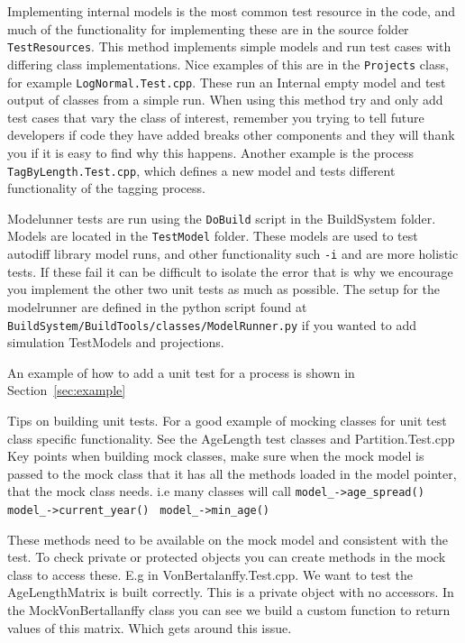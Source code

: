 Implementing internal models is the most common test resource in the code, and much of the functionality for implementing these are in the source folder \texttt{TestResources}. This method implements simple models and run test cases with differing class implementations. Nice examples of this are in the \texttt{Projects} class, for example \texttt{LogNormal.Test.cpp}. These run an Internal empty model and test output of classes from a simple run. When using this method try and only add test cases that vary the class of interest, remember you trying to tell future developers if code they have added breaks other components and they will thank you if it is easy to find why this happens. Another example is the process \texttt{TagByLength.Test.cpp}, which defines a new model and tests different functionality of the tagging process.


Modelunner tests are run using the \texttt{DoBuild} script in the BuildSystem folder. Models are located in the \texttt{TestModel} folder. These models are used to test autodiff library model runs, and other functionality such \texttt{-i} and are more holistic tests. If these fail it can be difficult to isolate the error that is why we encourage you implement the other two unit tests as much as possible. The setup for the modelrunner are defined in the python script found at \texttt{BuildSystem/BuildTools/classes/ModelRunner.py} if you wanted to add simulation TestModels and projections.

An example of how to add a unit test for a process is shown in Section~\ref{sec:example}

Tips on building unit tests. For a good example of mocking classes for unit test class specific functionality. See the AgeLength test classes and Partition.Test.cpp Key points when building mock classes, make sure when the mock model is passed to the mock class that it has all the methods loaded in the model pointer, that the mock class needs. i.e many classes will call 
\texttt{model\_->age\_spread()}
\texttt{model\_->current\_year() }
\texttt{model\_->min\_age()}

These methods need to be available on the mock model and consistent with the test. To check private or protected objects you can create methods in the mock class to access these. E.g in VonBertalanffy.Test.cpp. We want to test the AgeLengthMatrix is built correctly. This is a private object with no accessors. In the MockVonBertallanffy class you can see we build a custom function to return values of this matrix. Which gets around this issue.

